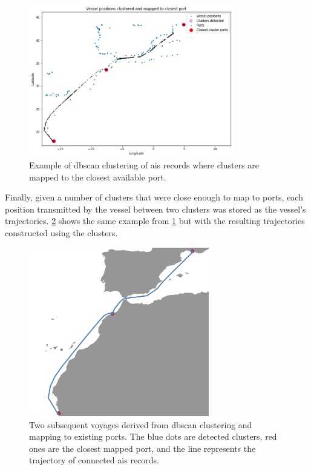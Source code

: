 \begin{figure}[htbp]
    \centering
    \includegraphics[width=0.8\textwidth]{figures/dbscan/clustering}
    \caption{Example of \acrshort{dbscan} clustering of \acrshort{ais} records where clusters are mapped to the closest available port.}
    \label{fig:dbscan_clustering}
\end{figure}

Finally, given a number of clusters that were close enough to map to ports, each position transmitted by the vessel between two clusters was stored as the vessel's trajectories. \cref{fig:clustered_trajectories} shows the same example from \cref{fig:dbscan_clustering} but with the resulting trajectories constructed using the clusters.

\begin{figure}[htbp]
    \centering
    \includegraphics[width=0.7\textwidth]{figures/dbscan/cluster_voyage}
    \caption{Two subsequent voyages derived from \acrshort{dbscan} clustering and mapping to existing ports. The blue dots are detected clusters, red ones are the closest mapped port, and the line represents the trajectory of connected \acrshort{ais} records.}
    \label{fig:clustered_trajectories}
\end{figure}

